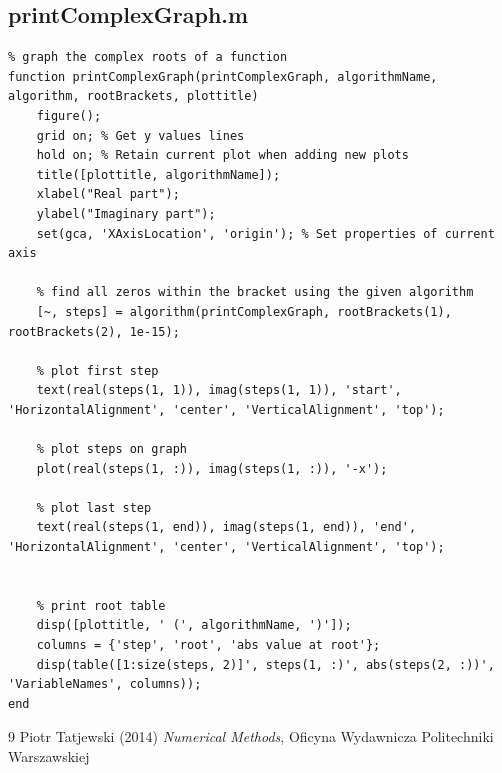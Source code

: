 \subsection{printComplexGraph.m}
\begin{simplechar}
\begin{lstlisting}
% graph the complex roots of a function
function printComplexGraph(printComplexGraph, algorithmName, algorithm, rootBrackets, plottitle)
    figure();
    grid on; % Get y values lines
    hold on; % Retain current plot when adding new plots
    title([plottitle, algorithmName]);
    xlabel("Real part");
    ylabel("Imaginary part");
    set(gca, 'XAxisLocation', 'origin'); % Set properties of current axis

    % find all zeros within the bracket using the given algorithm
    [~, steps] = algorithm(printComplexGraph, rootBrackets(1), rootBrackets(2), 1e-15);

    % plot first step
    text(real(steps(1, 1)), imag(steps(1, 1)), 'start', 'HorizontalAlignment', 'center', 'VerticalAlignment', 'top');

    % plot steps on graph
    plot(real(steps(1, :)), imag(steps(1, :)), '-x');

    % plot last step
    text(real(steps(1, end)), imag(steps(1, end)), 'end', 'HorizontalAlignment', 'center', 'VerticalAlignment', 'top');


    % print root table
    disp([plottitle, ' (', algorithmName, ')']);
    columns = {'step', 'root', 'abs value at root'};
    disp(table([1:size(steps, 2)]', steps(1, :)', abs(steps(2, :))', 'VariableNames', columns));
end
\end{lstlisting}
\end{simplechar}


\begin{thebibliography}{9}
Piotr Tatjewski (2014) \emph{Numerical Methods}, Oficyna Wydawnicza Politechniki Warszawskiej
\end{thebibliography}


